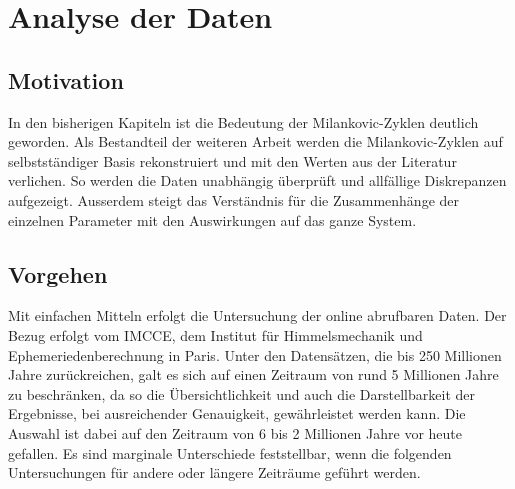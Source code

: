 %
%
%
%
\section{Analyse der Daten 
\label{milankovic:section:WissenschaftlicheArbeit}}

\subsection{Motivation
	\label{milankovic:subsection:Motivation}}
In den bisherigen Kapiteln ist die Bedeutung der Milankovic-Zyklen deutlich geworden. Als Bestandteil der weiteren Arbeit werden die Milankovic-Zyklen auf selbstständiger Basis rekonstruiert und mit den Werten aus der Literatur verlichen. So werden die Daten unabhängig überprüft und allfällige Diskrepanzen aufgezeigt. Ausserdem steigt das Verständnis für die Zusammenhänge der einzelnen Parameter mit den Auswirkungen auf das ganze System. 

\subsection{Vorgehen
\label{milankovic:subsection:Vorgehen}}
Mit einfachen Mitteln erfolgt die Untersuchung der online abrufbaren Daten.
Der Bezug erfolgt vom IMCCE, dem Institut für Himmelsmechanik und Ephemeriedenberechnung in Paris.
\cite{milankovic:vo.imcce.fr}
Unter den Datensätzen, die bis 250 Millionen Jahre zurückreichen, galt es sich auf einen Zeitraum von rund 5 Millionen Jahre zu beschränken, da so die Übersichtlichkeit und auch die Darstellbarkeit der Ergebnisse, bei ausreichender Genauigkeit, gewährleistet werden kann.
Die Auswahl ist dabei auf den Zeitraum von 6 bis 2 Millionen Jahre vor heute gefallen.
Es sind marginale Unterschiede feststellbar, wenn die folgenden Untersuchungen für andere oder längere Zeiträume geführt werden.

